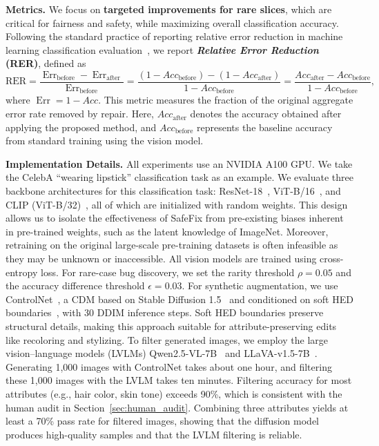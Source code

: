 \documentclass[10pt]{article} %
\newcommand{\controlnet}{ControlNet\xspace}
\newcommand{\qwen}{Qwen2.5-VL\xspace}
\newcommand{\llava}{LLaVA-v1.5\xspace}
\begin{document}
\noindent\textbf{Metrics.} We focus on \textbf{targeted improvements for rare slices}, which are critical for fairness and safety, while maximizing overall classification accuracy. Following the standard practice of reporting relative error reduction in machine learning classification evaluation~\citep{manning1999foundations}, we report \textbf{\emph{Relative Error Reduction} (RER)}, defined as
\vspace{-4pt}
\begin{equation}
\mathrm{RER}
= \dfrac{\operatorname{Err}_{\text{before}} - \operatorname{Err}_{\text{after}}}
{\operatorname{Err}_{\text{before}}}
= \dfrac{(1 - Acc_{\text{before}}) - (1 - Acc_{\text{after}})}{1 - Acc_{\text{before}}}
= \dfrac{Acc_{\text{after}} - Acc_{\text{before}}}{1 - Acc_{\text{before}}},
\end{equation}
where $\operatorname{Err}=1-Acc$. This metric measures the fraction of the original aggregate error rate removed by repair. Here, $Acc_{\text{after}}$ denotes the accuracy obtained after applying the proposed method, and $Acc_{\text{before}}$ represents the baseline accuracy from standard training using the vision model.

\noindent \textbf{Implementation Details.} All experiments use an NVIDIA A100 GPU\@.
We take the CelebA ``wearing lipstick'' classification task as an example.  
We evaluate three backbone architectures for this classification task: ResNet-18~\citep{he2016deep}, ViT-B/16~\citep{dosovitskiy2020vit}, and CLIP (ViT-B/32)~\citep{radford2021learning}, all of which are initialized with random weights. This design allows us to isolate the effectiveness of SafeFix from pre-existing biases inherent in pre-trained weights, such as the latent knowledge of ImageNet. Moreover, retraining on the original large-scale pre-training datasets is often infeasible as they may be unknown or inaccessible. All vision models are trained using cross-entropy loss. For rare-case bug discovery, we set the rarity threshold \(\rho = 0.05\) and the accuracy difference threshold \(\epsilon = 0.03\). For synthetic augmentation, we use \controlnet~\citep{zhang2023adding}, a CDM based on Stable Diffusion 1.5~\citep{rombach2022high} and conditioned on soft HED boundaries~\citep{xie2015holistically}, with 30 DDIM inference steps. Soft HED boundaries preserve structural details, making this approach suitable for attribute-preserving edits like recoloring and stylizing.
To filter generated images, we employ the large vision--language models (LVLMs) \qwen{}-7B~\citep{bai2025qwen25vl} and \llava{}-7B~\citep{liu2023improvedllava}. Generating 1,000 images with ControlNet takes about one hour, and filtering these 1,000 images with the LVLM takes ten minutes. Filtering accuracy for most attributes (e.g., hair color, skin tone) exceeds 90\%, which is consistent with the human audit in Section~\ref{sec:human_audit}. Combining three attributes yields at least a 70\% pass rate for filtered images, showing that the diffusion model produces high-quality samples and that the LVLM filtering is reliable.
\end{document}
